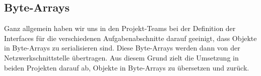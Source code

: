 \subsection{Byte-Arrays}

Ganz allgemein haben wir uns in den Projekt-Teams bei der Definition der Interfaces für die verschiedenen Aufgabenabschnitte darauf geeinigt, dass Objekte in Byte-Arrays zu serialisieren sind. Diese Byte-Arrays werden dann von der Netzwerkschnittstelle übertragen. Aus diesem Grund zielt die Umsetzung in beiden Projekten darauf ab, Objekte in Byte-Arrays zu übersetzen und zurück.
